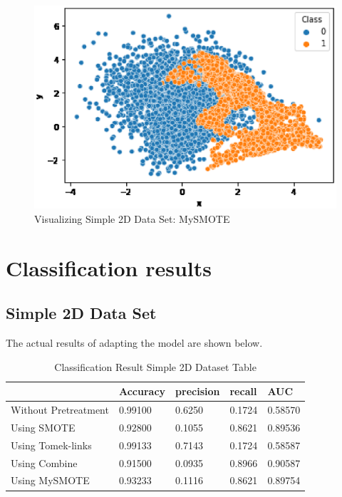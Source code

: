 \begin{center}
    \begin{figure}[ht]
        \caption{Visualizing Simple 2D Data Set: MySMOTE}
        \label{tab:team-rating-features}
        \begin{center}
            \includegraphics[scale=0.6]{image/mysmote.eps}
        \end{center}
    \end{figure}
\end{center}

\clearpage

\section{Classification results}
\subsection{Simple 2D Data Set}
The actual results of adapting the model are shown below.
\begin{table}[H]
    \caption{Classification Result Simple 2D Dataset Table}
    \centering
    \begin{tabular}{|l|l|l|l|l|}
    \hline
         & Accuracy & precision & recall & AUC \\ \hline
        Without Pretreatment & 0.99100 & 0.6250 & 0.1724 & 0.58570 \\ \hline
        Using SMOTE & 0.92800 & 0.1055 & 0.8621 & 0.89536 \\ \hline
        Using Tomek-links & 0.99133 & 0.7143 & 0.1724 & 0.58587 \\ \hline
        Using Combine & 0.91500 & 0.0935 & 0.8966 & 0.90587 \\ \hline
        Using MySMOTE & 0.93233 & 0.1116 & 0.8621 & 0.89754 \\ \hline
    \end{tabular}
\end{table}



